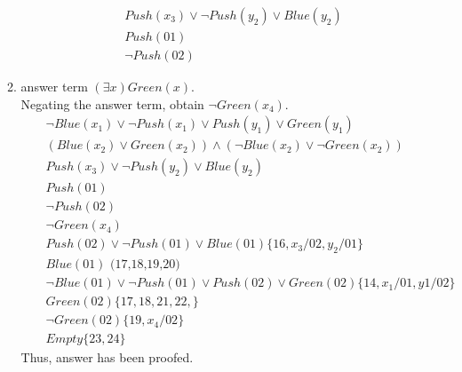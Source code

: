 \normalfont\documentclass[letterpaper,11pt]{article}
\begin{document}
\begin{enumerate}
\begin{enumerate}
\begin{eqnarray*}
		&& Push(x_3) \lor \neg Push(y_2)\lor Blue(y_2)\\
		&&Push(01)\\
		&&\neg Push(02)
	\end{eqnarray*}
	\item
	answer term $(\exists x) Green(x)$.\\
	 Negating the answer term, obtain $\neg Green(x_4)$.
	\begin{eqnarray}
		&&\neg Blue(x_1)\lor \neg Push(x_1) \lor Push(y_1) \lor Green(y_1)\\
		&&(Blue(x_2)\lor Green(x_2)) \land (\neg Blue(x_2) \lor \neg Green(x_2))\\
		&& Push(x_3) \lor \neg Push(y_2)\lor Blue(y_2)\\
		&&Push(01)\\
		&&\neg Push(02)\\
		&&\neg Green(x_4)\\
		&&Push(02) \lor \neg Push(01)\lor Blue(01) \{ 16, x_3/02, y_2/01\} \\
		&&Blue(01) \text{ (17,18,19,20)}\\
		&&\neg Blue(01)\lor \neg Push(01) \lor Push(02) \lor Green(02)\{14, x_1/01,y1/02 \} \\
		&&Green(02)\{17,18,21,22,\}\\
		&&\neg Green(02)\{19, x_4/02\}\\
		&&Empty\{23,24\}
	\end{eqnarray}
	Thus, answer has been proofed.
\end{enumerate}
\end{enumerate}
\end{document}
